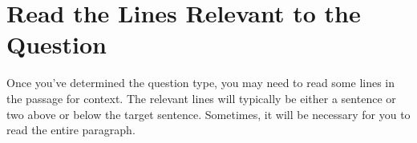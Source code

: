\section{Read the Lines Relevant to the Question}

Once you've determined the question type, you may need to read some lines in the passage for
context. The relevant lines will typically be either a sentence or two above or below the target
sentence. Sometimes, it will be necessary for you to read the entire paragraph.